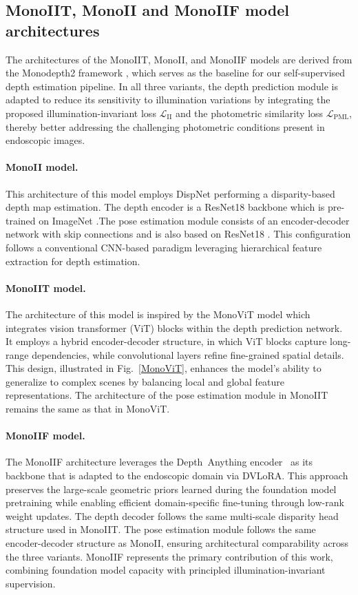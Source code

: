 \documentclass[a4paper,fleqn]{cas-dc}
\begin{document}
{\subsection{MonoIIT, MonoII and MonoIIF model architectures}  
%
The architectures of the MonoIIT, MonoII, and MonoIIF models are derived from the Monodepth2 framework \citep{Godard_ICCV_2019}, which serves as the baseline for our self-supervised depth estimation pipeline. In all three variants, the depth prediction module is adapted to reduce its sensitivity to illumination variations by integrating the proposed illumination-invariant loss $\mathcal{L}_\textrm{II}$ and the photometric similarity loss $\mathcal{L}_\textrm{PML}$, thereby better addressing the challenging photometric conditions present in endoscopic images.

%
\paragraph{\bf MonoII model.}  
This architecture of this model employs DispNet performing a disparity-based depth map estimation. The depth encoder is a ResNet18 backbone which is pre-trained on ImageNet \citep{Deng_CVPR_2009}.The pose estimation module consists of an encoder-decoder network with skip connections and is also based on ResNet18 \citep{He_CVPR_2016}. This configuration follows a conventional CNN-based paradigm leveraging hierarchical feature extraction for depth estimation.  
%
\paragraph{\bf MonoIIT model.}  
The architecture of this model is inspired by the MonoViT model \citep{Zhao_3DV_2022} which integrates vision transformer (ViT) blocks within the depth prediction network. It employs a hybrid encoder-decoder structure, in which ViT blocks capture long-range dependencies, while convolutional layers refine fine-grained spatial details. This design, illustrated in Fig.~\ref{MonoViT}, enhances the model’s ability to generalize to complex scenes by balancing local and global feature representations. The architecture of the pose estimation module in MonoIIT remains the same as that in MonoViT.
%

\paragraph{MonoIIF model.}
The MonoIIF architecture leverages the Depth~Anything encoder~\citep{yang2024depth} as its backbone that is
adapted to the endoscopic domain via DVLoRA. This approach preserves the large-scale geometric priors 
learned during the foundation model pretraining while enabling efficient domain-specific fine-tuning through 
low-rank weight updates. The depth decoder follows the same multi-scale disparity head structure used 
in MonoIIT. The pose estimation module follows the same encoder-decoder structure as MonoII, ensuring 
architectural comparability across the three variants. MonoIIF represents the primary contribution of this 
work, combining foundation model capacity with principled illumination-invariant supervision.

}
\end{document}
